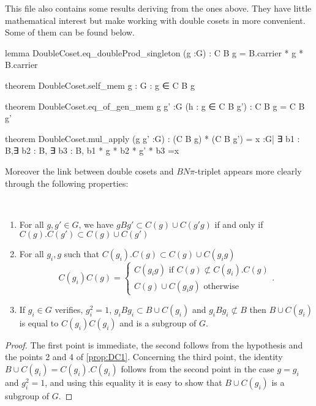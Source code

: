 This file also contains some results deriving from the ones above. They have little mathematical interest but make working with double cosets in \Lean more convenient. Some of them can be found below.

\begin{leancode}
lemma DoubleCoset.eq_doubleProd_singleton (g :G) : C B g = B.carrier * {g} * B.carrier

theorem DoubleCoset.self_mem {g : G} : g ∈ C B g

theorem DoubleCoset.eq_of_gen_mem {g g' :G} (h : g ∈ C B g') : C B g = C B g'

theorem DoubleCoset.mul_apply (g g' :G) :
  (C B g) * (C B g') = {x :G| ∃ b1 : B,∃ b2 : B, ∃ b3 : B, b1 * g * b2 * g' * b3 =x}
\end{leancode}

Moreover the link between double cosets and $BN\pi$-triplet appears more clearly through the following properties: 

\begin{proprietes} \label{prop:DC2} \
    \begin{enumerate}
\item For all $g,g' \in G$, we have  $g B g' \subset C(g) \cup C(g'g) $ if and only if $C(g). C(g') \subset C(g) \cup  C(g')$
\item For all $g_i, g$ such that $C(g_i).C(g) \subset C(g) \cup C(g_i g)$
     \[
     C(g_i) C(g) = \begin{cases}
         C(g_ig) \text{ if } C(g) \not \subset C(g_i).C(g)\\
         C(g) \cup C(g_ig) \text{ otherwise}
     \end{cases}
     .\] 
 \item If $g_{i} \in G$ verifies, $g_{i}^2 = 1$,  $g_{i} B g_{i} \subset B \cup C(g_{i})$ and $g_{i} B g_{i} \not\subset B$ then $B \cup C(g_{i})$  is equal to $C(g_i) C(g_i)$ and is a subgroup of $G$.
    \end{enumerate}
\end{proprietes}

\begin{proof}
The first point is immediate, the second follows from the hypothesis and the points 2 and 4 of \ref{prop:DC1}. Concerning the third point, the identity $B \cup C(g_{i}) = C(g_i). C\left( g_i \right)$  follows from the second point in the case $g = g_i$ and $g_i ^2 = 1$, and using this equality it is easy to show that $B \cup C(g_i)$ is a subgroup of $G$.
\end{proof} 

